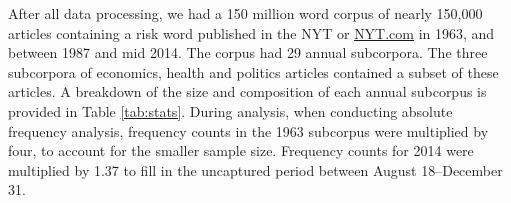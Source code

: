     After all data processing, we had a 150 million word corpus of nearly 150,000 articles containing a risk word published in the NYT or \url{NYT.com} in 1963, and between 1987 and mid 2014. The corpus had 29 annual subcorpora. The three subcorpora of economics, health and politics articles contained a subset of these articles. A breakdown of the size and composition of each annual subcorpus is provided in Table \ref{tab:stats}. During analysis, when conducting absolute frequency analysis, frequency counts in the 1963 subcorpus were multiplied by four, to account for the smaller sample size. Frequency counts for 2014 were multiplied by 1.37 to fill in the uncaptured period between August 18--December 31.

    \begin{table}
        \centering
        \footnotesize
    \begin{tabular}{p{1.5cm}|l|l|l|l|}

\hline


\end{tabular}
\end{table}
